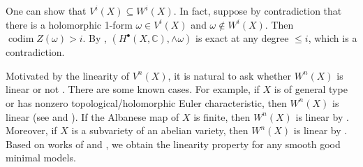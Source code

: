\documentclass[a4paper,12pt,reqno]{amsart}
\theoremstyle{question}
\theoremstyle{definition}
\theoremstyle{remark}
\theoremstyle{cited}
\theoremstyle{citeddef}
\def\CC{{\mathbb C}}
\DeclareMathOperator{\codim}{codim}
\begin{document}
One can show that $V^i(X)\subseteq W^i(X)$. In fact, suppose by contradiction that there is a holomorphic 1-form $\omega\in V^i(X)$ and $\omega\notin W^i(X)$. Then $\codim Z(\omega)>i$. By \cite[Proposition~3.4]{GL87}, $(H^{\bullet}(X,\CC),\wedge\omega)$ is exact at any degree $\leq i$, which is a contradiction.  


     
Motivated by the linearity of $V^n(X)$, it is natural to ask whether $W^n(X)$ is linear or not \cite[Question 1.10]{DHL24}. There are some known cases. For example,  if $X$ is of general type or has nonzero topological/holomorphic Euler characteristic, then $W^n(X)$ is linear (see \cite{PS14} and \cite{GL87}). %
If the Albanese map of $X$ is finite, then $W^n(X)$ is linear by \cite{DHL24}. Moreover, if $X$ is a subvariety of an abelian variety, then $W^n(X)$ is linear by \cite{Ueno75}. Based on works of \cite{Chu24} and \cite{HWZ26}, we obtain the linearity property for any smooth good minimal models.
\end{document}
